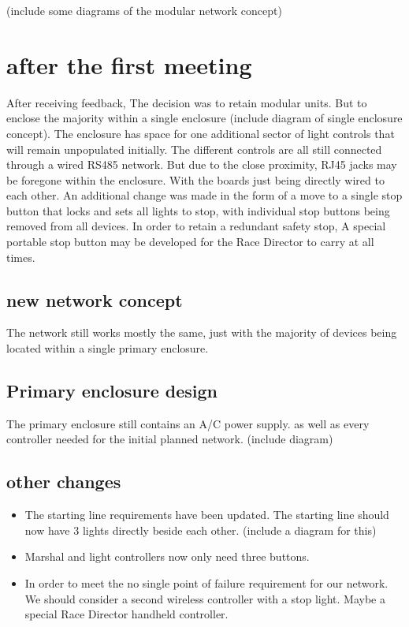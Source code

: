 \documentclass{article}
\begin{document}
     (include some diagrams of the modular network concept)
     
     \section{after the first meeting}
     After receiving feedback, The decision was to retain modular units. 
     But to enclose the majority within a single enclosure (include diagram of single enclosure concept). 
     The enclosure has space for one additional sector of light controls that will remain unpopulated initially. 
     The different controls are all still connected through a wired RS485 network. 
     But due to the close proximity, RJ45 jacks may be foregone within the enclosure. 
     With the boards just being directly wired to each other.
     An additional change was made in the form of a move to a single stop button that locks and sets all lights to stop, with individual stop buttons being removed from all devices.
     In order to retain a redundant safety stop, A special portable stop button may be developed for the Race Director to carry at all times.
     
     \subsection{new network concept}
     The network still works mostly the same, just with the majority of devices being  located within a single primary enclosure.
     
     \subsection{Primary enclosure design}
     The primary enclosure still contains an A/C power supply. as well as every controller needed for the initial planned network.
     (include diagram)
     \subsection{other changes}
     \begin{itemize}
     	\item The starting line requirements have been updated. 
     	The starting line should now have 3 lights directly beside each other.
     	(include a diagram for this)
     	\item Marshal and light controllers now only need three buttons.
     	\item In order to meet the no single point of failure requirement for our network.
     	We should consider a second wireless controller with a stop light. Maybe a special Race Director handheld controller.
     \end{itemize}
\end{document}
